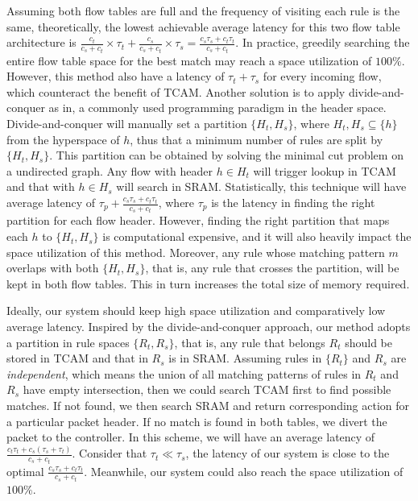 \documentclass[10pt,twocolumn,letterpaper]{article}
\begin{document}
Assuming both flow tables are full and the frequency of visiting each rule is the same, theoretically, the lowest achievable average latency for this two flow table architecture is $\frac{c_t}{c_s+c_t} \times \tau_t+\frac{c_s}{c_s+c_t} \times \tau_s=\frac{c_s \tau_s + c_t \tau_t}{c_s+c_t}$. In practice, greedily searching the entire flow table space for the best match may reach a space utilization of $100\%$. However, this method also have a latency of $\tau_t+\tau_s$ for every incoming flow, which counteract the benefit of TCAM. Another solution is to apply divide-and-conquer as in\cite{yan2014cab}, a commonly used programming paradigm in the header space. Divide-and-conquer will manually set a partition $\{H_t, H_s\}$, where $H_t, H_s \subseteq \{h\}$ from the hyperspace of $h$, thus that a minimum number of rules are split by $\{H_t, H_s\}$. This partition can be obtained by solving the minimal cut problem on a undirected graph. Any flow with header $h\in H_t$ will trigger lookup in TCAM and that with $h\in H_s$ will search in SRAM. Statistically, this technique will have average latency of $\tau_p+ \frac{c_s \tau_s + c_t \tau_t}{c_s+c_t}$, where $\tau_p$ is the latency in finding the right partition for each flow header. However, finding the right partition that maps each $h$ to $\{H_t, H_s\}$ is computational expensive, and it will also heavily impact the space utilization of this method. Moreover, any rule whose matching pattern $m$ overlaps with both $\{H_t, H_s\}$, that is, any rule that crosses the partition, will be kept in both flow tables. This in turn increases the total size of memory required.

Ideally, our system should keep high space utilization and comparatively low average latency. Inspired by the divide-and-conquer approach, our method adopts a partition in rule spaces $\{R_t, R_s\}$, that is, any rule that belongs $R_t$ should be stored in TCAM and that in $R_s$ is in SRAM. Assuming rules in $\{R_t\}$ and $R_s$ are \textit{independent}, which means the union of all matching patterns of rules in $R_t$ and $R_s$ have empty intersection, then we could search TCAM first to find possible matches. If not found, we then search SRAM and return corresponding action for a particular packet header. If no match is found in both tables, we divert the packet to the controller. In this scheme, we will have an average latency of $\frac{c_t \tau_t + c_s (\tau_s+\tau_t)}{c_s+c_t}$. Consider that $\tau_t \ll \tau_s$, the latency of our system is close to the optimal $\frac{c_s \tau_s + c_t \tau_t}{c_s+c_t}$. Meanwhile, our system could also reach the space utilization of $100\%$.
\end{document}
